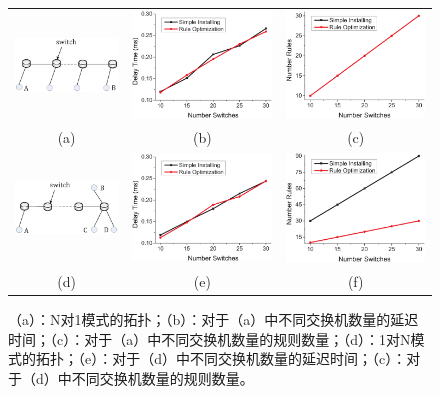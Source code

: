 \begin{figure} [t]
\begin{center}
\scalebox{0.9}
{
\begin{tabular}{ccc}
\includegraphics[width=0.3\columnwidth]{figures/fig-e-31-a.eps}&
\includegraphics[width=0.3\columnwidth]{figures/fig-e-1-24.eps}&\hspace{-0.1\columnwidth}
\includegraphics[width=0.3\columnwidth]{figures/fig-e-2-24.eps} \\
(a) & (b) & (c)
\\
\includegraphics[width=0.3\columnwidth]{figures/fig-e-31-d.eps}&
\includegraphics[width=0.3\columnwidth]{figures/fig-e-3-24.eps}&\hspace{-0.1\columnwidth}
\includegraphics[width=0.3\columnwidth]{figures/fig-e-4-24.eps} \\
(d) & (e) & (f)
\end{tabular}
}
\caption{（a）：N对1模式的拓扑；（b）：对于（a）中不同交换机数量的延迟时间；（c）：对于（a）中不同交换机数量的规则数量；（d）：1对N模式的拓扑；（e）：对于（d）中不同交换机数量的延迟时间；（c）：对于（d）中不同交换机数量的规则数量。} \label{fig9}
  \end{center}
\vspace{-0.3in}
\end{figure}

